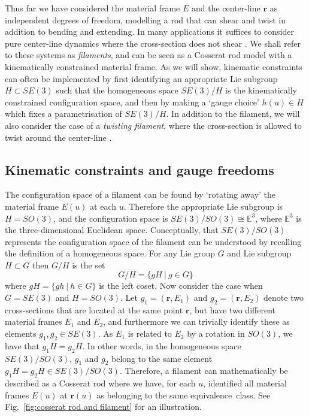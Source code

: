 Thus far we have considered the material frame $E$ and the center-line $\mathbf{r}$ as independent degrees of freedom, modelling a rod that can shear and twist in addition to bending and extending. In many applications it suffices to consider pure center-line dynamics where the cross-section does not shear \citep{eloyKinematicsMostEfficient2012, tornbergSimulatingDynamicsInteractions2004, goldsteinNonlinearDynamicsStiff1995, sodaDynamicsStiffChains1973, nordgrenComputationMotionElastic1974, hasimotoSolitonVortexFilament1972}. We shall refer to these systems as \textit{filaments}, and can be seen as a Cosserat rod model with a kinematically constrained material frame. As we will show, kinematic constraints can often be implemented by first identifying an appropriate Lie subgroup $H \subset SE(3)$ such that the homogeneous space $SE(3) / H$ is the kinematically constrained configuration space, and then by making a `gauge choice' $h(u) \in H$ which fixes a parametrisation of $SE(3) / H$. In addition to the filament, we will also consider the case of a \textit{twisting filament}, where the cross-section is allowed to twist around the center-line \citep{powersDynamicsFilamentsMembranes2010, parkerDerivationNonlinearRod1984a, goldsteinViscousNonlinearDynamics1998}.

\subsection{Kinematic constraints and gauge freedoms} \label{sec:Kinematic constraints and gauge freedoms}

The configuration space of a filament can be found by `rotating away' the material frame $E(u)$ at each $u$. Therefore the appropriate Lie subgroup is $H = SO(3)$, and the configuration space is $SE(3) / SO(3) \cong \mathbb{E}^3$, where $\mathbb{E}^3$ is the three-dimensional Euclidean space. Conceptually, that $SE(3)/SO(3)$ represents the configuration space of the filament can be understood by recalling the definition of a homogeneous space. For any Lie group $G$ and Lie subgroup $H \subset G$ then $G/H$ is the set
\begin{equation}
G / H = \{ gH\ |\ g \in G \}
\end{equation}
where $gH = \{ gh\ |\ h \in G \}$ is the left coset. Now consider the case when $G = SE(3)$ and $H = SO(3)$. Let $g_1 = (\mathbf{r}, E_1)$ and $g_2 = (\mathbf{r}, E_2)$ denote two cross-sections that are located at the same point $\mathbf{r}$, but have two different material frames $E_1$ and $E_2$, and furthermore we can trivially identify these as elements $g_1, g_2 \in SE(3)$. As $E_1$ is related to $E_2$ by a rotation in $SO(3)$, we have that $g_1 H = g_2 H$. In other words, in the homogeneous space $SE(3)/SO(3)$, $g_1$ and $g_2$ belong to the same element $g_1 H = g_2 H \in SE(3)/SO(3)$. Therefore, a filament can mathematically be described as a Cosserat rod where we have, for each $u$, identified all material frames $E(u)$ at $\mathbf{r}(u)$ as belonging to the same equivalence~class. See Fig.~\ref{fig:cosserat rod and filament} for an illustration.

